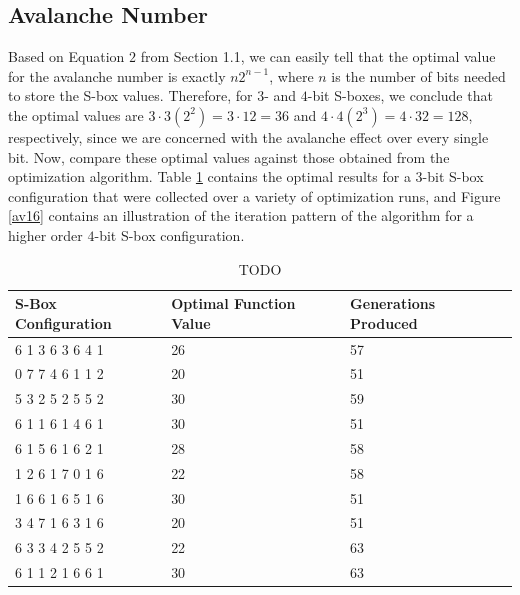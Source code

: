 \documentclass[11pt]{article}
\begin{document}
\subsection{Avalanche Number}


Based on Equation $2$ from Section 1.1, we can easily tell that the optimal value for the avalanche number is exactly $n2^{n-1}$, where $n$ is the number of bits needed to store the S-box values. Therefore, for $3$- and $4$-bit S-boxes, we conclude that the optimal values are $3 \cdot 3(2^2) = 3 \cdot 12 = 36$ and $4 \cdot 4(2^3) = 4 \cdot 32 = 128$, respectively, since we are concerned with the avalanche effect over every single bit. Now, compare these optimal values against those obtained from the optimization algorithm. Table \ref{avTable} contains the optimal results for a $3$-bit S-box configuration that were collected over a variety of optimization runs, and Figure \ref{av16} contains an illustration of the iteration pattern of the algorithm for a higher order $4$-bit S-box configuration.

\begin{table}
	\centering
	\label{avTable}
	\caption{TODO}
    \begin{tabular}{|l|l|l|}
        \hline
        S-Box Configuration & Optimal Function Value & Generations Produced \\ \hline
        6     1     3     6     3     6     4     1 & 26 & 57 \\ 
        0     7     7     4     6     1     1     2 & 20 & 51 \\ 
        5     3     2     5     2     5     5     2 & 30 & 59 \\ 
        6     1     1     6     1     4     6     1 & 30 & 51 \\ 
        6     1     5     6     1     6     2     1 & 28 & 58 \\ 
        1     2     6     1     7     0     1     6 & 22 & 58 \\ 
        1     6     6     1     6     5     1     6 & 30 & 51 \\ 
        3     4     7     1     6     3     1     6 & 20 & 51 \\ 
        6     3     3     4     2     5     5     2 & 22 & 63 \\ 
        6     1     1     2     1     6     6     1 & 30 & 63 \\
        \hline
    \end{tabular}
\end{table}
\end{document}
